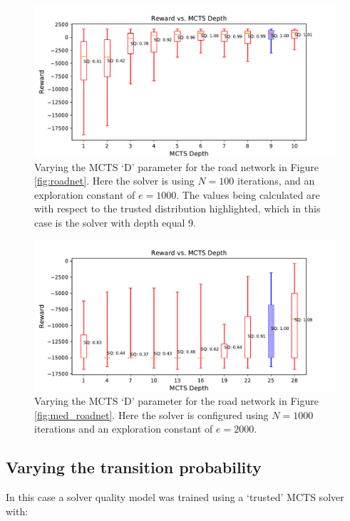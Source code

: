\begin{figure}[tbp]
    \centering
    \includegraphics[width=1.0\linewidth]{Figures/sq_roadnet_mcts_i100e1000.pdf}
    \caption{Varying the MCTS `D' parameter for the road network in Figure \ref{fig:roadnet}. Here the solver is using $N=100$ iterations, and an exploration constant of $e=1000$. The \xQ{} values being calculated are with respect to the trusted distribution highlighted, which in this case is the solver with depth equal 9.}
    \label{fig:mcts_d}
\end{figure}
\begin{figure}[tbp]
    \centering
    \includegraphics[width=1.0\linewidth]{Figures/sq_mednet_mcts_i1000e2000.pdf}
    \caption{Varying the MCTS `D' parameter for the road network in Figure \ref{fig:med_roadnet}. Here the solver is configured using $N=1000$ iterations and an exploration constant of $e=2000$.}
    \label{fig:mcts_d_med}
\end{figure}


\subsection{Varying the transition probability}
In this case a solver quality model was trained using a `trusted' MCTS solver with:


